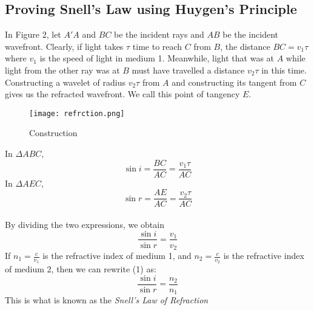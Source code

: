 \documentclass{article}
\begin{document}
\subsection{Proving Snell's Law using Huygen's Principle}
In Figure 2, let $A'A$ and $BC$ be the incident rays and $AB$ be the incident wavefront. Clearly, if light takes $\tau$ time to reach $C$ from $B$, the distance $BC = v_1 \tau$ where $v_1$ is the speed of light in medium 1. Meanwhile, light that was at $A$ while light from the other ray was at $B$ must have travelled a distance $v_2\tau$ in this time. Constructing a wavelet of radius $v_2 \tau$ from $A$ and constructing its tangent from $C$ gives us the refracted wavefront. We call this point of tangency $E$. \newline
\begin{figure}[htp]
    \centering
    \texttt{[image: refrction.png]}
    \caption{Construction}
    \label{fig:galaxy}
\end{figure}
\newline
In $\Delta ABC$,
\begin{equation*}
    \sin{i} = \frac{BC}{AC} = \frac{v_1 \tau}{AC}
\end{equation*}
In $\Delta AEC$,
\begin{equation*}
    \sin{r} = \frac{AE}{AC} = \frac{v_2 \tau}{AC}
\end{equation*} \\ 
By dividing the two expressions, we obtain
\begin{equation}
    \frac{\sin i}{\sin r} = \frac{v_1}{v_2}
\end{equation}
If $n_1 = \frac{c}{v_1}$ is the refractive index of medium 1, and $n_2 = \frac{c}{v_2}$ is the refractive index of medium 2, then we can rewrite (1) as:
\begin{equation}
    \frac{\sin i}{\sin r}  = \frac{n_2}{n_1}
\end{equation}
This is what is known as the \emph{Snell's Law of Refraction}
\newpage
\end{document}
